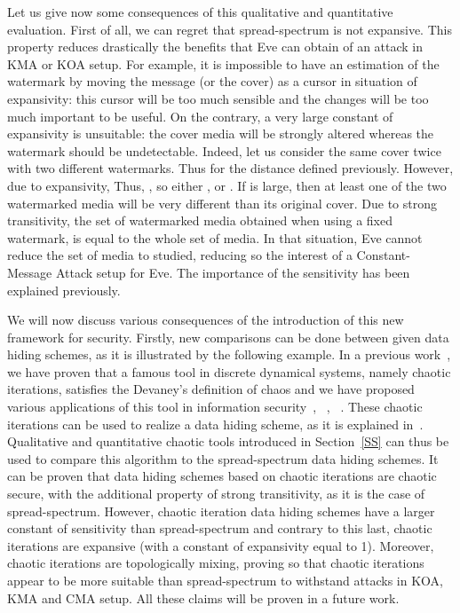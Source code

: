 \documentclass{llncs}
\begin{document}
Let us give now some consequences of this qualitative and quantitative evaluation. First of all, we can regret that spread-spectrum is not expansive. This property reduces drastically the benefits that Eve can obtain of an attack in KMA or KOA setup. For example, it is impossible to have an estimation of the watermark by moving the message (or the cover) as a cursor in situation of expansivity: this cursor will be too much sensible and the changes will be too much important to be useful. 
On the contrary, a very large constant of expansivity  is unsuitable: the cover media will be strongly altered whereas the watermark should be undetectable. Indeed, let us consider the same cover twice with two different watermarks. Thus  for the distance defined previously. However, due to expansivity,  Thus, , so either , or . If  is large, then at least one of the two watermarked media will be very different than its original cover.
Due to strong transitivity, the set of watermarked media obtained when using a fixed watermark, is equal to the whole set of media. In that situation, Eve cannot reduce the set of media to studied, reducing so the interest of a Constant-Message Attack setup for Eve. The importance of the sensitivity has been explained previously.

We will now discuss various consequences of the introduction of this new framework for security. Firstly, new comparisons can be done between given data hiding schemes, as it is illustrated by the following example. In a previous work~\cite{guyeux10}, we have proven that a famous tool in discrete dynamical systems, namely chaotic iterations, satisfies the Devaney's definition of chaos and we have proposed various applications of this tool in information security~\cite{internet09}, ~\cite{guyeux09}, ~\cite{guyeux10}. These chaotic iterations can be used to realize a data hiding scheme, as it is explained in~\cite{arxiv}. Qualitative and quantitative chaotic tools introduced in Section~\ref{SS} can thus be used to compare this algorithm to the spread-spectrum data hiding schemes. It can be proven that data hiding schemes based on chaotic iterations are chaotic secure, with the additional property of strong transitivity, as it is the case of spread-spectrum. However, chaotic iteration data hiding schemes have a larger constant of sensitivity than spread-spectrum and contrary to this last, chaotic iterations are expansive (with a constant of expansivity equal to 1). Moreover, chaotic iterations are topologically mixing, proving so that chaotic iterations appear to be more suitable than spread-spectrum to withstand attacks in KOA, KMA and CMA setup. All these claims will be proven in a future work.
\end{document}
